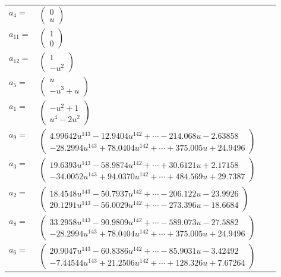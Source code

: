 \documentclass[1p]{elsarticle_modified}
\theoremstyle{definition}
\begin{document}
\begin{tabular}{m{7pt} m{180pt} m{7pt} m{180pt} }
\flushright $a_{4}=$&$\begin{pmatrix}0\\u\end{pmatrix}$ \\
\flushright $a_{11}=$&$\begin{pmatrix}1\\0\end{pmatrix}$ \\
\flushright $a_{12}=$&$\begin{pmatrix}1\\- u^2\end{pmatrix}$ \\
\flushright $a_{5}=$&$\begin{pmatrix}u\\- u^3+u\end{pmatrix}$ \\
\flushright $a_{1}=$&$\begin{pmatrix}- u^2+1\\u^4-2 u^2\end{pmatrix}$ \\
\flushright $a_{9}=$&$\begin{pmatrix}4.99642 u^{143}-12.9404 u^{142}+\cdots-214.068 u-2.63858\\-28.2994 u^{143}+78.0404 u^{142}+\cdots+375.005 u+24.9496\end{pmatrix}$ \\
\flushright $a_{3}=$&$\begin{pmatrix}19.6393 u^{143}-58.9874 u^{142}+\cdots+30.6121 u+2.17158\\-34.0052 u^{143}+94.0370 u^{142}+\cdots+484.569 u+29.7387\end{pmatrix}$ \\
\flushright $a_{2}=$&$\begin{pmatrix}18.4548 u^{143}-50.7937 u^{142}+\cdots-206.122 u-23.9926\\20.1291 u^{143}-56.0029 u^{142}+\cdots-273.396 u-18.6684\end{pmatrix}$ \\
\flushright $a_{8}=$&$\begin{pmatrix}33.2958 u^{143}-90.9809 u^{142}+\cdots-589.073 u-27.5882\\-28.2994 u^{143}+78.0404 u^{142}+\cdots+375.005 u+24.9496\end{pmatrix}$ \\
\flushright $a_{6}=$&$\begin{pmatrix}20.9047 u^{143}-60.8386 u^{142}+\cdots-85.9031 u-3.42492\\-7.44544 u^{143}+21.2506 u^{142}+\cdots+128.326 u+7.67264\end{pmatrix}$ \\

\end{tabular}
\end{document}
